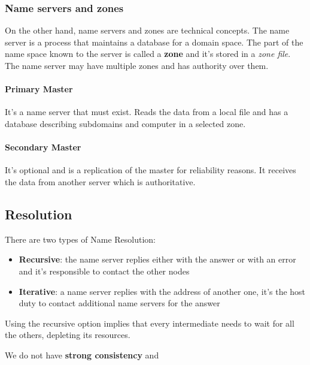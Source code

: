 \subsubsection{Name servers and zones}
On the other hand, name servers and zones are technical concepts. The name server is a process that maintains a database for a domain space. The part of the name space known to the server is called a \textbf{zone} and it's stored in a \textit{zone file}. The name server may have multiple zones and has authority over them.
\paragraph{Primary Master} It's a name server that must exist. Reads the data from a local file and has a database describing subdomains and computer in a selected zone.
\paragraph{Secondary Master} It's optional and is a replication of the master for reliability reasons. It receives the data from another server which is authoritative.

\subsection{Resolution}
There are two types of Name Resolution:
\begin{itemize}
	\item \textbf{Recursive}: the name server replies either with the answer or with an error and it's responsible to contact the other nodes
	\item \textbf{Iterative}: a name server replies with the address of another one, it's the host duty to contact additional name servers for the answer
\end{itemize} 

\begin{question}
	Using the recursive option implies that every intermediate needs to wait for all the others, depleting its resources.
\end{question}

\begin{question}
	We do not have \textbf{strong consistency} and 
\end{question}

